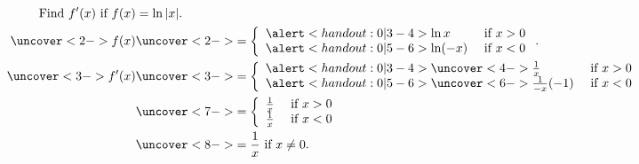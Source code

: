 \begin{frame}
\begin{example}[Example 6, p. 223]
\abovedisplayskip=0pt
\belowdisplayskip=0pt
\abovedisplayshortskip=0pt
\belowdisplayshortskip=0pt
\begin{align*}
\text{Find $f'(x)$ if } f(x) & = \ln |x|.\\
\uncover<2->{%
f(x) %
}%
& \uncover<2->{
 = \left\{ \begin{array}{lr}
\alert<handout:0| 3-4>{\ln x} & \text{ if } x > 0 \\
\alert<handout:0| 5-6>{\ln (-x)} & \text{ if } x < 0 \\
\end{array}\right. .
}\\%
\uncover<3->{%
f'(x) %
}%
& \uncover<3->{
 = \left\{ \begin{array}{lr}
\alert<handout:0| 3-4>{\uncover<4->{\frac{1}{x}}} & \text{ if } x > 0 \\
\alert<handout:0| 5-6>{\uncover<6->{\frac{1}{-x}(-1)}} & \text{ if } x < 0 \\
\end{array}\right.
}\\%
& \uncover<7->{
 = \left\{ \begin{array}{lr}
\frac{1}{x} & \text{ if } x > 0 \\
\frac{1}{x} & \text{ if } x < 0 \\
\end{array}\right.
}\\%
& \uncover<8->{%
 = \frac{1}{x} \text{ if } x \neq 0.
}%
\end{align*}
\end{example}
\end{frame}
